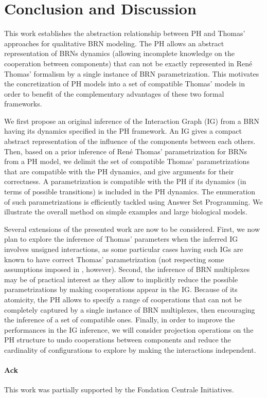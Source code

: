 \section{Conclusion and Discussion}

This work establishes the abstraction relationship between PH and Thomas' approaches for
qualitative BRN modeling.
The PH allows an abstract representation of BRNs dynamics (allowing incomplete knowledge on the
cooperation between components) that can not be exactly represented in Ren\'e Thomas' formalism by a
single instance of BRN parametrization.
This motivates the concretization of PH models into a set of compatible Thomas' models in order to benefit
of the complementary advantages of these two formal frameworks.

We first propose an original inference of the Interaction Graph (IG) from a BRN
having its dynamics specified in the PH framework.
An IG gives a compact abstract representation of the influence of the components between each
others.
Then, based on a prior inference of Ren\'e Thomas' parametrization for BRNs from a PH model, we
delimit the set of compatible Thomas' parametrizations that are compatible with the PH dynamics,
and give arguments for their correctness.
A parametrization is compatible with the PH if its dynamics (in terms of possible transitions) is included in the PH dynamics.
The enumeration of such parametrizations is efficiently tackled using Answer Set Programming.
We illustrate the overall method on simple examples and large biological models.

Several extensions of the presented work are now to be considered.
First, we now plan to explore the inference of Thomas' parameters when the inferred IG involves unsigned interactions, as some particular cases having such IGs are known to have correct
Thomas' parametrization (not respecting some assumptions imposed in ,
however).
Second, the inference of BRN multiplexes \cite{BernotMultiplexes} may be of practical interest 
as they allow to implicitly reduce the possible parametrizations by making cooperations appear
in the IG.
Because of its atomicity, the PH allows to specify a range of cooperations that can not be
completely captured by a single instance of BRN multiplexes, then encouraging the inference of a set
of compatible ones.
Finally, in order to improve the performances in the IG inference, we will consider projection operations on
the PH structure to undo cooperations between components and reduce the cardinality of
configurations to explore by making the interactions independent.

\paragraph{Ack}
This work was partially supported by the Fondation Centrale Initiatives.
